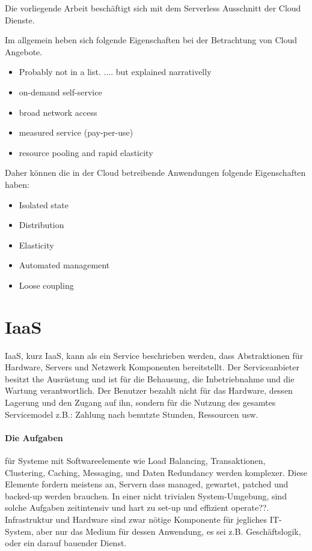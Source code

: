 \documentclass[
12pt,
english,
ngerman,
headsepline,
twoside,
openright,
numbers=noenddot,version=first
]{scrreprt}
\begin{document}
Die vorliegende Arbeit beschäftigt sich mit dem Serverless Ausschnitt der Cloud Dienste. 

Im allgemein heben sich folgende Eigenschaften bei der Betrachtung von Cloud Angebote.
\begin{itemize}
	\item Probably not in a list. .... but explained narrativelly
	\item on-demand self-service
	\item broad network access
	\item measured service (pay-per-use)
	\item resource pooling and rapid elasticity
\end{itemize}

Daher können die in der Cloud betreibende Anwendungen folgende Eigenschaften haben: 
\begin{itemize}
	\item Isolated state
	\item Distribution
	\item Elasticity
	\item Automated management
	\item Loose coupling
\end{itemize}


\section{IaaS}
\label{sec:iaas}
\acrfull{IaaS}, kurz \acrshort{IaaS}, kann als ein Service beschrieben werden, dass Abstraktionen für Hardware, Servers und Netzwerk Komponenten bereitstellt. Der Serviceanbieter besitzt the Ausrüstung und ist für die Behausung, die Inbetriebnahme und die Wartung verantwortlich\cite{patternAWS}. Der Benutzer bezahlt nicht für das Hardware, dessen Lagerung und den Zugang auf ihn, sondern für die Nutzung des gesamtes Servicemodel z.B.: Zahlung nach benutzte Stunden, Ressourcen usw.

\paragraph{Die Aufgaben} für Systeme mit Softwareelemente wie Load Balancing, Transaktionen, Clustering, Caching, Messaging, und Daten Redundancy werden komplexer. Diese Elemente fordern meistens an, Servern dass managed, gewartet, patched und backed-up werden brauchen. In einer nicht trivialen System-Umgebung, sind solche Aufgaben zeitintensiv und hart zu set-up und effizient operate??. Infrastruktur und Hardware sind zwar nötige Komponente für jegliches IT-System, aber nur das Medium für dessen Anwendung, es sei z.B. Geschäftslogik, oder ein darauf bauender Dienst.
\end{document}
